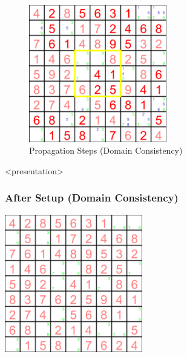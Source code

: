 \begin{frame}
{\vfill
{}
}
\end{frame}

\begin{figure}[ht]
\caption{\label{sudoku:propagationdc}Propagation Steps (Domain Consistency)}
\begin{center}
\includegraphics[width=6cm]{../sudoku/DC/frame24}
\end{center}
\end{figure}


\begin{frame}<presentation>
\frametitle{After Setup (Domain Consistency)}
\includegraphics[width=6cm]{../sudoku/DC/frame29}
\end{frame}

